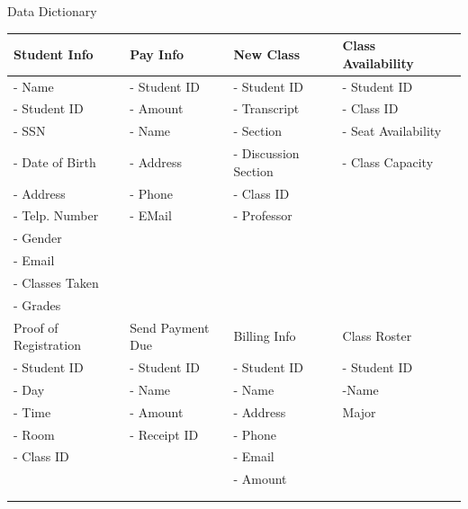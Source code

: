 \documentclass{article}
\begin{document}
\tableofcontents
\newpage
\begin{section}{Data Dictionary}
\begin{center}
    \begin{tabular}{ | l | l | l |l| p{5cm} |}
   \hline
    Student Info & Pay Info & New Class & Class Availability \\ \hline

    

    
    - Name          &  - Student ID &  - Student ID           & - Student ID  \\
    - Student ID    &  - Amount     &  - Transcript           & - Class ID  \\ 
    - SSN           &  - Name       &  - Section              & - Seat Availability\\ 
    - Date of Birth &  - Address    &  - Discussion Section   & - Class Capacity   \\ 
    - Address       &  - Phone      &  - Class ID             &   \\ 
    - Telp. Number  &  - EMail      &  - Professor            &   \\ 
    - Gender        &               &                         &   \\ 
    - Email         &               &                         &   \\ 
    - Classes Taken &               &                         &   \\ 
    - Grades        &               &                         &\\ \hline

    
       
    
Proof of Registration & Send Payment Due & Billing Info & Class Roster\\ \hline
       - Student ID   &  - Student ID    &  - Student ID& - Student ID  \\ 
       - Day          &  - Name          &  - Name      & -Name\\
       - Time         &  - Amount        &  - Address   & Major   \\ 
       - Room         &  - Receipt ID    &  - Phone     &   \\ 
       - Class ID     &                  &    - Email   & \\ 
                      &                  &    - Amount  & \\
                      &                  &              &   \\ 
                      &                  &               &\\ \hline
    
    
    
    
    
    
    
    
    
    \hline
    \end{tabular}
\end{center}
\end{section}
\newpage
\end{document}
